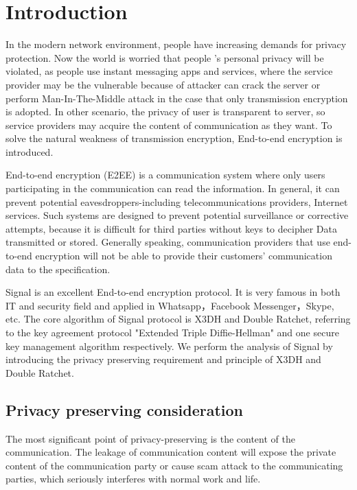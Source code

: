 \documentclass[11pt,en]{elegantpaper}
\begin{document}
\section{Introduction}
In the modern network environment, people have increasing demands for privacy protection. Now the world is worried that people ’s personal privacy will be violated, as people use instant messaging apps and services, where the service provider may be the vulnerable because of attacker can crack the server or perform Man-In-The-Middle attack in the case that only transmission encryption is adopted\cite{rosler2018more}. In other scenario, the privacy of user is transparent to server, so service providers may acquire the content of communication as they want. To solve the natural weakness of transmission encryption, End-to-end encryption is introduced.

End-to-end encryption (E2EE) is a communication system where only users participating in the communication can read the information. In general, it can prevent potential eavesdroppers-including telecommunications providers, Internet services. Such systems are designed to prevent potential surveillance or corrective attempts, because it is difficult for third parties without keys to decipher Data transmitted or stored\cite{zhang2007security}. Generally speaking, communication providers that use end-to-end encryption will not be able to provide their customers' communication data to the specification.

Signal is an excellent End-to-end encryption protocol.\cite{alwen2019double} It is very famous in both IT and security field and applied in Whatsapp，Facebook Messenger，Skype, etc. The core algorithm of Signal protocol is X3DH and Double Ratchet, referring to the key agreement protocol "Extended Triple Diffie-Hellman" and one secure key management algorithm respectively\cite{cohn2017formal}.
We perform the analysis of Signal by introducing the privacy preserving requirement and principle of X3DH and Double Ratchet.

\subsection{Privacy preserving consideration}
The most significant point of privacy-preserving is the content of the communication. The leakage of communication content will expose the private content of the communication party or cause scam attack to the communicating parties, which seriously interferes with normal work and life.
\end{document}
